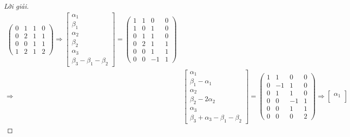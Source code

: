 \documentclass[class=linearalgebra,crop=false]{standalone}
\begin{document}
\begin{proof}[Lời giải]
\begin{align*}
\begin{pmatrix}
            0 & 1 & 1 & 0 \\
            0 & 2 & 1 & 1 \\
            0 & 0 & 1 & 1 \\
            1 & 2 & 1 & 2
        \end{pmatrix}
        \Longrightarrow
        \begin{bmatrix}
            \alpha_{1} \\
            \beta_{1}  \\
            \alpha_{2} \\
            \beta_{2}  \\
            \alpha_{3} \\
            \beta_{3} - \beta_{1} - \beta_{2}
        \end{bmatrix}=
        \begin{pmatrix}
            1 & 1 & 0  & 0 \\
            1 & 0 & 1  & 0 \\
            0 & 1 & 1  & 0 \\
            0 & 2 & 1  & 1 \\
            0 & 0 & 1  & 1 \\
            0 & 0 & -1 & 1
        \end{pmatrix}                    \\
        \Longrightarrow &
        \begin{bmatrix}
            \alpha_{1}              \\
            \beta_{1} - \alpha_{1}  \\
            \alpha_{2}              \\
            \beta_{2} - 2\alpha_{2} \\
            \alpha_{3}              \\
            \beta_{3} + \alpha_{3} - \beta_{1} - \beta_{2}
        \end{bmatrix}=
        \begin{pmatrix}
            1 & 1  & 0  & 0 \\
            0 & -1 & 1  & 0 \\
            0 & 1  & 1  & 0 \\
            0 & 0  & -1 & 1 \\
            0 & 0  & 1  & 1 \\
            0 & 0  & 0  & 2
        \end{pmatrix}
        \Longrightarrow
        \begin{bmatrix}
            \alpha_{1}                           \\

\end{bmatrix}
\end{align*}
\end{proof}
\end{document}
